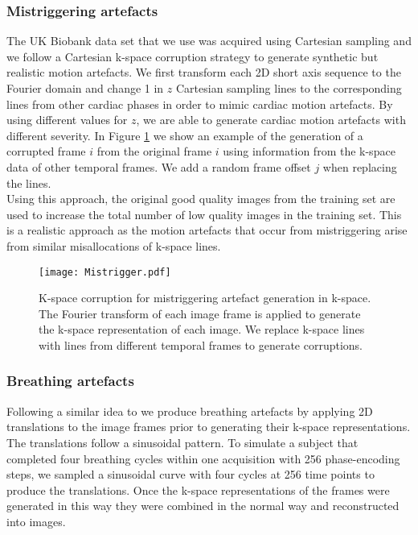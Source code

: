 \documentclass[preprint,12pt,authoryear]{elsarticle}
\begin{document}
\subsubsection{Mistriggering artefacts}

The UK Biobank data set that we use was acquired using Cartesian sampling and we follow a Cartesian k-space corruption strategy to generate synthetic but realistic motion artefacts. We first transform each 2D short axis sequence to the Fourier domain and change 1 in $z$ Cartesian sampling lines to the corresponding lines from other cardiac phases in order to mimic cardiac motion artefacts. By using different values for $z$, we are able to generate cardiac motion artefacts with different severity. In Figure \ref{fig:Kspacemistrigg} we show an example of the generation of a corrupted frame $i$ from the original frame $i$ using information from the k-space data of other temporal frames. We add a random frame offset $j$ when replacing the lines.\\

Using this approach, the original good quality images from the training set are used to increase the total number of  low quality images in the training set. This is a realistic approach as the motion artefacts that occur from mistriggering arise from similar misallocations of k-space lines.


 \begin{figure}[tb]
  \centering
  \centerline{\texttt{[image: Mistrigger.pdf]}}
\caption{K-space corruption for mistriggering artefact generation in k-space. The Fourier transform of each image frame is applied to generate the k-space representation of each image. We replace k-space lines with lines from different temporal frames to generate corruptions. }
\label{fig:Kspacemistrigg}
\end{figure}


\subsubsection{Breathing artefacts}

Following a similar idea to \cite{Lorch2017} we produce breathing artefacts by applying 2D translations to the image frames prior to generating their k-space representations. The translations follow a sinusoidal pattern. To simulate a subject that completed four breathing cycles within one acquisition with 256 phase-encoding steps, we sampled a sinusoidal curve with four cycles at 256 time points to produce the translations.
Once the k-space representations of the frames were generated in this way they were combined in the normal way and reconstructed into images.\\
\end{document}
